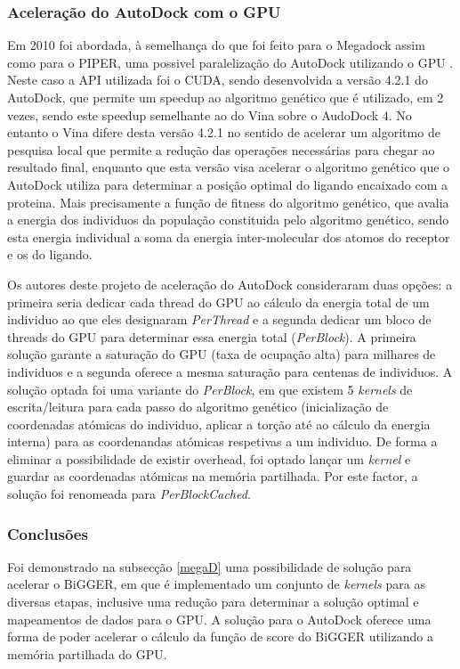 \subsubsection{Aceleração do AutoDock com o GPU}
 Em 2010 foi abordada, à semelhança do que foi feito para o Megadock assim como para o PIPER, uma possivel paralelização do AutoDock utilizando o GPU \cite{autodockCuda}. Neste caso a API utilizada foi o CUDA, sendo desenvolvida a versão 4.2.1 do AutoDock, que permite um speedup ao algoritmo genético que é utilizado, em 2 vezes, sendo este speedup semelhante ao do Vina sobre o AudoDock 4.  No entanto o Vina difere desta versão 4.2.1 no sentido de acelerar um algoritmo de pesquisa local que permite a redução das operações necessárias para chegar ao resultado final, enquanto que esta versão visa acelerar o algoritmo genético que o AutoDock utiliza para determinar a posição optimal do ligando encaixado com a proteina. Mais precisamente a função de fitness do algoritmo genético, que avalia a energia dos individuos da população constituida pelo algoritmo genético, sendo esta energia individual a soma da energia inter-molecular dos atomos do receptor e os do ligando.

Os autores deste projeto de aceleração do AutoDock consideraram duas opções: a primeira seria dedicar cada thread do GPU ao cálculo da energia total de um individuo ao que eles designaram  \textit{PerThread} e a segunda dedicar um bloco de threads do GPU para determinar essa energia total (\textit{PerBlock}). A primeira solução garante a saturação do GPU (taxa de ocupação alta) para milhares de individuos e a segunda oferece a mesma saturação para centenas de individuos.
A solução optada foi uma variante do \textit{PerBlock}, em que existem 5 \textit{kernels} de escrita/leitura para cada passo do algoritmo genético (inicialização de coordenadas atómicas do individuo, aplicar a torção até ao cálculo da energia interna) para as coordenandas atómicas respetivas a um individuo. De forma a eliminar a possibilidade de existir overhead, foi optado lançar um \textit{kernel} e guardar as coordenadas atómicas na memória partilhada. Por este factor, a solução foi renomeada para \textit{PerBlockCached}.
 \subsubsection{Conclusões}
 Foi demonstrado na subsecção \ref{megaD} uma possibilidade de solução para acelerar o BiGGER, em que é implementado um conjunto de \textit{kernels} para as diversas etapas, inclusive uma redução para determinar a solução optimal e mapeamentos de dados para o GPU. A solução para o AutoDock oferece uma forma de poder acelerar o cálculo da função de score do BiGGER utilizando a memória partilhada do GPU. 
 
